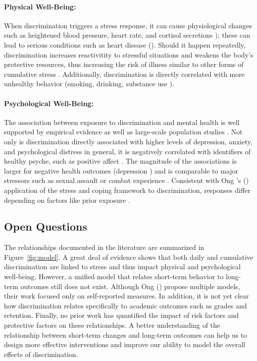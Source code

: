 \paragraph{Physical Well-Being:}
\label{sec:back-discrimination-physical}
When discrimination triggers a stress response, it can cause physiological changes such as heightened blood pressure, heart rate, and cortisol secretions \citep{Brondolo:2008, Steffen:2003, Smart:2010}); these can lead to serious conditions such as heart disease (\eg \cite{Marshall:1997, Cohen:1994}). Should it happen repeatedly, discrimination increases reactivitity to stressful situations \citep{GuyllMatthewsBrom-berger:2001} and weakens the body's protective resources, thus increasing the risk of illness similar to other forms of cumulative stress \citep{GeeSpencerChenTakeuchi:2007}. Additionally, discrimination is directly correlated with more unhealthy behavior (\eg smoking, drinking, substance use \citep{LandrineKlonoff:1996, MartinTuchRoman:2003}). 

\paragraph{Psychological Well-Being:}
\label{sec:back-discrimination-mental}
The association between exposure to discrimination and mental health is well supported by empirical evidence \citep{Pascoe:2009} as well as large-scale population studies \citep{Kessler:1999}. Not only is discrimination directly associated with higher levels of depression, anxiety, and psychological distress in general, it is negatively correlated with identifiers of healthy psyche, such as positive affect \citep{Schmitt:2014}. The magnitude of the associations is larger for negative health outcomes (\eg depression \citep{Schmitt:2014}) and is comparable to major stressors such as sexual assault or combat experience \citep{Kessler:1999}. 
Consistent with Ong \etal's (\citep{Ong:2009}) application of the stress and coping framework to discrimination, responses differ depending on factors like prior exposure  \citep{Kessler:1999}. 

\subsection{Open Questions}
\noindent The relationships documented in the literature are summarized in Figure~\ref{fig:model}.  A great deal of evidence shows that both daily and cumulative discrimination are linked to stress and thus impact physical and psychological well-being.  However, a unified model that relates short-term behavior to long-term outcomes still does not exist. Although Ong \etal (\citeyear{Ong:2009}) propose multiple models, their work focused only on self-reported measures. In addition, it is not yet clear how discrimination relates specifically to academic outcomes such as grades and retention. Finally, no prior work has quantified the impact of risk factors and protective factors on these relationships. A better understanding of the relationship between short-term changes and long-term outcomes can help us to design more effective interventions and improve our ability to model the overall effects of discrimination.
